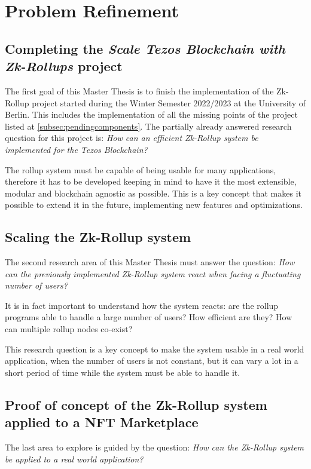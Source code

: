 \section{Problem Refinement\label{sec:4_problemrefinement}}

\subsection{Completing the \textit{Scale Tezos Blockchain with Zk-Rollups} project}
The first goal of this Master Thesis is to finish the implementation of the Zk-Rollup project started during the Winter Semester 2022/2023 at the University of Berlin. This includes the implementation of all the missing points of the project listed at \ref{subsec:pendingcomponents}. The partially already answered research question for this project is: \textit{How can an efficient Zk-Rollup system be implemented for the Tezos Blockchain?}

The rollup system must be capable of being usable for many applications, therefore it has to be developed keeping in mind to have it the most extensible, modular and blockchain agnostic as possible. This is a key concept that makes it possible to extend it in the future, implementing new features and optimizations.

\subsection{Scaling the Zk-Rollup system}
The second research area of this Master Thesis must answer the question: \textit{How can the previously implemented  Zk-Rollup system react when facing a fluctuating number of users?}

It is in fact important to understand how the system reacts: are the rollup programs able to handle a large number of users? How efficient are they? How can multiple rollup nodes co-exist?

This research question is a key concept to make the system usable in a real world application, when the number of users is not constant, but it can vary a lot in a short period of time while the system must be able to handle it.

\subsection{Proof of concept of the Zk-Rollup system applied to a NFT Marketplace}
The last area to explore is guided by the question: \textit{How can the Zk-Rollup system be applied to a real world application?}

